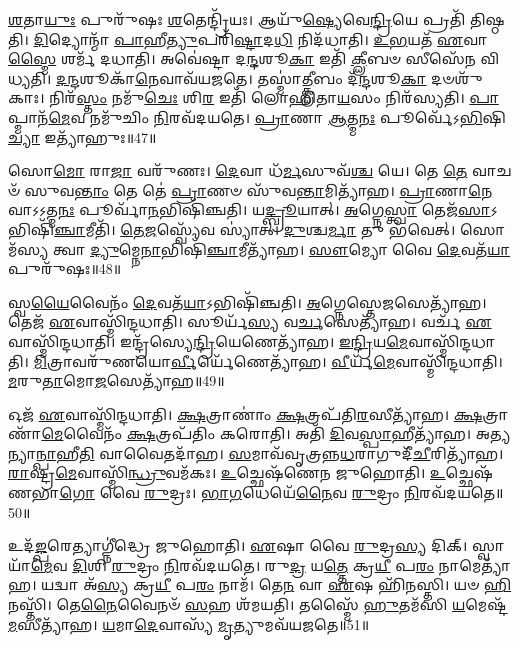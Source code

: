 \-\ul{𑌶}\-𑌤𑌾\-\ul{𑌯𑍁𑌃} 𑌪𑍁𑌰𑍁᳴𑌷𑌃 \ul{𑌶}\-𑌤𑍇𑌨𑍍𑌦𑍍𑌰𑌿᳴𑌯𑌃।
𑌆𑌯𑍁᳴\-\ul{𑌷𑍍𑌯𑍇}\-𑌵𑍇\-\ul{𑌨𑍍𑌦𑍍𑌰𑌿}\-𑌯𑍇 𑌪𑍍𑌰𑌤𑌿᳴ 𑌤𑌿𑌷𑍍𑌠𑌤𑌿।
\-\ul{𑌦𑌿}\-𑌦𑍍𑌯𑍋𑌨𑍍𑌮𑌾᳴ \ul{𑌪𑌾}\-𑌹𑍀\-\ul{𑌤𑍍𑌯𑍁}\-𑌪𑌰𑌿᳴\-\ul{𑌷𑍍𑌟𑌾}\-𑌦\-\ul{𑌧𑌿} 𑌨𑌿𑌦᳴𑌧𑌾𑌤𑌿।
\-\ul{𑌉}\-\-\ul{𑌭}\-𑌯𑌤᳴ \ul{𑌏}\-𑌵𑌾\-\ul{𑌸𑍍𑌮𑍈} 𑌶𑌰𑍍𑌮᳴ 𑌦𑌧𑌾𑌤𑌿।
𑌅𑌵𑍇॑𑌷𑍍𑌟𑌾 𑌦\-\ul{𑌨𑍍𑌦}\-𑌶𑍂\-\ul{𑌕𑌾} 𑌇𑌤𑌿᳴ \ul{𑌕𑍍𑌲𑍀}\-𑌬𑍞 𑌸𑍀𑌸𑍇᳴𑌨 𑌵𑌿𑌧𑍍𑌯𑌤𑌿।
\-\ul{𑌦}\-\-\ul{𑌨𑍍𑌦}\-𑌶𑍂𑌕𑌾᳴\-\ul{𑌨𑍇}\-𑌵𑌾𑌵᳴𑌯𑌜𑌤𑍇।
𑌤𑌸𑍍𑌮𑌾॑\-\ul{𑌤𑍍𑌕𑍍𑌲𑍀}\-𑌬𑌂 𑌦᳴\-\ul{𑌨𑍍𑌦}\-𑌶𑍂\-\ul{𑌕𑌾} 𑌦𑍞𑌶𑍁᳴𑌕𑌾𑌃।
𑌨𑌿𑌰᳴\-\ul{𑌸𑍍𑌤𑌂} 𑌨𑌮𑍁᳴\-\ul{𑌚𑍇𑌃} 𑌶𑌿\-\ul{𑌰} 𑌇𑌤𑌿᳴ 𑌲𑍋𑌹𑌿𑌤𑌾\-\ul{𑌯}\-𑌸𑌂 𑌨𑌿𑌰᳴𑌸𑍍𑌯𑌤𑌿।
\-\ul{𑌪𑌾}\-𑌪𑍍𑌮𑌾𑌨᳴\-\ul{𑌮𑍇}\-𑌵 𑌨𑌮𑍁᳴𑌚𑌿𑌂 \ul{𑌨𑌿}\-𑌰𑌵᳴𑌦𑌯𑌤𑍇।
\-\ul{𑌪𑍍𑌰𑌾}\-𑌣𑌾 \ul{𑌆}\-𑌤𑍍𑌮\-\ul{𑌨𑌃} 𑌪𑍂𑌰𑍍𑌵𑍇᳴\-𑌽\-\ul{𑌭𑌿}\-𑌷𑌿\-\ul{𑌚𑍍𑌯𑌾} 𑌇𑌤𑍍𑌯𑌾᳴𑌹𑍁𑌃॥47॥

𑌸𑍋\-\ul{𑌮𑍋} 𑌰𑌾\-\ul{𑌜𑌾} 𑌵𑌰𑍁᳴𑌣𑌃।
\-\ul{𑌦𑍇}\-𑌵𑌾 𑌧᳴\-\ul{𑌰𑍍𑌮}\-𑌸𑍁𑌵᳴\-\ul{𑌶𑍍𑌚} 𑌯𑍇।
𑌤𑍇 \ul{𑌤𑍇} 𑌵𑌾𑌚𑍞᳴ 𑌸𑍁𑌵\-\ul{𑌨𑍍𑌤𑌾𑌂} 𑌤𑍇 𑌤𑍇॑ \ul{𑌪𑍍𑌰𑌾}\-𑌣𑍞 𑌸𑍁᳴𑌵\-\ul{𑌨𑍍𑌤𑌾}\-𑌮𑌿𑌤𑍍𑌯𑌾᳴𑌹।
\-\ul{𑌪𑍍𑌰𑌾}\-𑌣𑌾\-\ul{𑌨𑍇}\-𑌵𑌾\-𑌽𑌽𑌤𑍍𑌮\-\ul{𑌨𑌃} 𑌪𑍂𑌰𑍍𑌵𑌾᳴\-\ul{𑌨}\-𑌭𑌿𑌷𑌿᳴𑌞𑍍𑌚𑌤𑌿।
𑌯\-\ul{𑌦𑍍𑌬𑍍𑌰𑍂}\-𑌯𑌾𑌤𑍍।
\-\ul{𑌅}\-𑌗𑍍𑌨𑍇\-\ul{𑌸𑍍𑌤𑍍𑌵𑌾} 𑌤𑍇𑌜᳴\-\ul{𑌸𑌾}\-\-𑌽𑌭𑌿𑌷𑌿᳴\-\ul{𑌞𑍍𑌚𑌾}\-𑌮𑍀𑌤𑌿᳴।
\-\ul{𑌤𑍇}\-\-\ul{𑌜}\-𑌸𑍍𑌵𑍍𑌯𑍇᳴𑌵 𑌸𑍍𑌯𑌾॑𑌤𑍍।
\-\ul{𑌦𑍁}\-𑌶𑍍𑌚\-\ul{𑌰𑍍𑌮𑌾} 𑌤𑍁 𑌭᳴𑌵𑍇𑌤𑍍।
𑌸𑍋𑌮᳴𑌸𑍍𑌯 𑌤𑍍𑌵𑌾 \ul{𑌦𑍍𑌯𑍁}\-𑌮𑍍𑌨𑍇\-\ul{𑌨𑌾}\-𑌭𑌿𑌷𑌿᳴\-\ul{𑌞𑍍𑌚𑌾}\-𑌮𑍀𑌤𑍍𑌯𑌾᳴𑌹।
\-\ul{𑌸𑍗}\-𑌮𑍍𑌯𑍋 𑌵𑍈 \ul{𑌦𑍇}\-𑌵𑌤᳴\-\ul{𑌯𑌾} 𑌪𑍁𑌰𑍁᳴𑌷𑌃॥48॥

𑌸𑍍𑌵\-\ul{𑌯𑍈}\-𑌵𑍈𑌨𑌂᳴ \ul{𑌦𑍇}\-𑌵𑌤᳴\-\ul{𑌯𑌾}\-\-𑌽𑌭𑌿𑌷𑌿᳴𑌞𑍍𑌚𑌤𑌿।
\-\ul{𑌅}\-𑌗𑍍𑌨𑍇𑌸𑍍𑌤𑍇\-\ul{𑌜}\-𑌸𑍇𑌤𑍍𑌯𑌾᳴𑌹।
𑌤𑍇𑌜᳴ \ul{𑌏}\-𑌵𑌾𑌸𑍍𑌮𑌿᳴𑌨𑍍𑌦𑌧𑌾𑌤𑌿।
𑌸𑍂𑌰𑍍𑌯᳴\-\ul{𑌸𑍍𑌯} 𑌵\-\ul{𑌰𑍍𑌚}\-𑌸𑍇𑌤𑍍𑌯𑌾᳴𑌹।
𑌵𑌰𑍍𑌚᳴ \ul{𑌏}\-𑌵𑌾𑌸𑍍𑌮𑌿᳴𑌨𑍍𑌦𑌧𑌾𑌤𑌿।
𑌇𑌨𑍍𑌦𑍍𑌰᳴𑌸𑍍𑌯𑍇\-\ul{𑌨𑍍𑌦𑍍𑌰𑌿}\-𑌯𑍇𑌣𑍇𑌤𑍍𑌯𑌾᳴𑌹।
\-\ul{𑌇}\-\-\ul{𑌨𑍍𑌦𑍍𑌰𑌿}\-𑌯\-\ul{𑌮𑍇}\-𑌵𑌾𑌸𑍍𑌮𑌿᳴𑌨𑍍𑌦𑌧𑌾𑌤𑌿।
\-\ul{𑌮𑌿}\-𑌤𑍍𑌰𑌾𑌵𑌰𑍁᳴𑌣\-𑌯𑍋\-\ul{𑌰𑍍𑌵𑍀}\-𑌰𑍍𑌯𑍇᳴𑌣𑍇𑌤𑍍𑌯𑌾᳴𑌹।
\-\ul{𑌵𑍀}\-𑌰𑍍𑌯᳴\-\ul{𑌮𑍇}\-𑌵𑌾𑌸𑍍𑌮𑌿᳴𑌨𑍍𑌦𑌧𑌾𑌤𑌿।
\-\ul{𑌮}\-𑌰𑍁\-\ul{𑌤𑌾}\-𑌮𑍋\-\ul{𑌜}\-𑌸𑍇𑌤𑍍𑌯𑌾᳴𑌹॥49॥

𑌓𑌜᳴ \ul{𑌏}\-𑌵𑌾𑌸𑍍𑌮𑌿᳴𑌨𑍍𑌦𑌧𑌾𑌤𑌿।
\-\ul{𑌕𑍍𑌷}\-𑌤𑍍𑌰𑌾𑌣𑌾𑌂॑ \ul{𑌕𑍍𑌷}\-𑌤𑍍𑌰𑌪᳴𑌤𑌿\-\ul{𑌰}\-𑌸𑍀𑌤𑍍𑌯𑌾᳴𑌹।
\-\ul{𑌕𑍍𑌷}\-𑌤𑍍𑌰𑌾𑌣𑌾᳴\-\ul{𑌮𑍇}\-𑌵𑍈𑌨𑌂᳴ \ul{𑌕𑍍𑌷}\-𑌤𑍍𑌰𑌪᳴𑌤𑌿𑌂 𑌕𑌰𑍋𑌤𑌿।
𑌅𑌤𑌿᳴ \ul{𑌦𑌿}\-𑌵\-\ul{𑌸𑍍𑌪𑌾}\-𑌹𑍀𑌤𑍍𑌯𑌾᳴𑌹।
𑌅\-\ul{𑌤𑍍𑌯}\-𑌨𑍍𑌯𑌾\-\ul{𑌨𑍍𑌪𑌾}\-𑌹𑍀\-\ul{𑌤𑌿} 𑌵𑌾𑌵𑍈𑌤𑌦𑌾᳴𑌹।
\-\ul{𑌸}\-𑌮𑌾𑌵᳴𑌵𑍃𑌤𑍍𑌰𑌨𑍍𑌨\-\ul{𑌧}\-𑌰𑌾𑌗𑍁𑌦𑍀᳴\-\ul{𑌚𑍀}\-\-𑌰𑌿𑌤𑍍𑌯𑌾᳴𑌹।
\-\ul{𑌰𑌾}\-𑌷𑍍𑌟𑍍𑌰\-\ul{𑌮𑍇}\-𑌵𑌾𑌸𑍍𑌮𑌿᳴\-\ul{𑌨𑍍𑌧𑍍𑌰𑍁}\-𑌵𑌮᳴𑌕𑌃।
\-\ul{𑌉}\-𑌚𑍍𑌛𑍇𑌷᳴𑌣𑍇𑌨 𑌜𑍁𑌹𑍋𑌤𑌿।
\-\ul{𑌉}\-𑌚𑍍𑌛𑍇𑌷᳴𑌣𑌭𑌾\-\ul{𑌗𑍋} 𑌵𑍈 \ul{𑌰𑍁}\-𑌦𑍍𑌰𑌃।
\-\ul{𑌭𑌾}\-\-\ul{𑌗}\-𑌧𑍇𑌯𑍇᳴\-\ul{𑌨𑍈}\-𑌵 \ul{𑌰𑍁}\-𑌦𑍍𑌰𑌂 \ul{𑌨𑌿}\-𑌰𑌵᳴𑌦𑌯𑌤𑍇॥50॥

𑌉𑌦᳴\-\ul{𑌙𑍍𑌪}\-𑌰𑍇𑌤𑍍𑌯𑌾𑌗𑍍𑌨𑍀॑𑌦𑍍𑌧𑍍𑌰𑍇 𑌜𑍁𑌹𑍋𑌤𑌿।
\-\ul{𑌏}\-𑌷𑌾 𑌵𑍈 \ul{𑌰𑍁}\-𑌦𑍍𑌰\-\ul{𑌸𑍍𑌯} 𑌦𑌿𑌕𑍍।
𑌸𑍍𑌵𑌾𑌯𑌾᳴\-\ul{𑌮𑍇}\-𑌵 \ul{𑌦𑌿}\-𑌶𑌿 \ul{𑌰𑍁}\-𑌦𑍍𑌰𑌂 \ul{𑌨𑌿}\-𑌰𑌵᳴𑌦𑌯𑌤𑍇।
𑌰𑍁\-\ul{𑌦𑍍𑌰} 𑌯\-\ul{𑌤𑍍𑌤𑍇} 𑌕𑍍𑌰\-\ul{𑌯𑍀} 𑌪\-\ul{𑌰𑌂} 𑌨𑌾𑌮𑍇𑌤𑍍𑌯𑌾᳴𑌹।
𑌯𑌦𑍍𑌵𑌾 𑌅᳴\-\ul{𑌸𑍍𑌯} 𑌕𑍍𑌰\-\ul{𑌯𑍀} 𑌪\-\ul{𑌰𑌂} 𑌨𑌾𑌮᳴।
𑌤𑍇\-\ul{𑌨} 𑌵𑌾 \ul{𑌏}\-𑌷 𑌹𑌿᳴𑌨𑌸𑍍𑌤𑌿।
𑌯𑍞 \ul{𑌹𑌿}\-𑌨𑌸𑍍𑌤𑌿᳴।
𑌤𑍇\-\ul{𑌨𑍈}\-𑌵𑍈𑌨𑍞᳴ \ul{𑌸}\-𑌹 𑌶᳴𑌮𑌯𑌤𑌿।
𑌤𑌸𑍍𑌮𑍈᳴ \ul{𑌹𑍁}\-𑌤𑌮᳴𑌸𑌿 \ul{𑌯}\-𑌮𑍇𑌷𑍍𑌟᳴\-\ul{𑌮}\-𑌸𑍀𑌤𑍍𑌯𑌾᳴𑌹।
\-\ul{𑌯}\-𑌮𑌾\-\ul{𑌦𑍇}\-𑌵𑌾𑌸𑍍𑌯᳴ \ul{𑌮𑍃}\-𑌤𑍍𑌯𑍁𑌮𑌵᳴𑌯𑌜𑌤𑍇॥51॥

